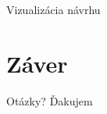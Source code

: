 \documentclass[hyperref={unicode}]{beamer}
\begin{document}
\begin{frame}{Vizualizácia návrhu}
\begin{figure}[htp]
	\end{figure}
\end{frame}


\section{Záver}

\begin{frame}{Otázky?}
	\centering
	{\Large Ďakujem}
\end{frame}
\end{document}
